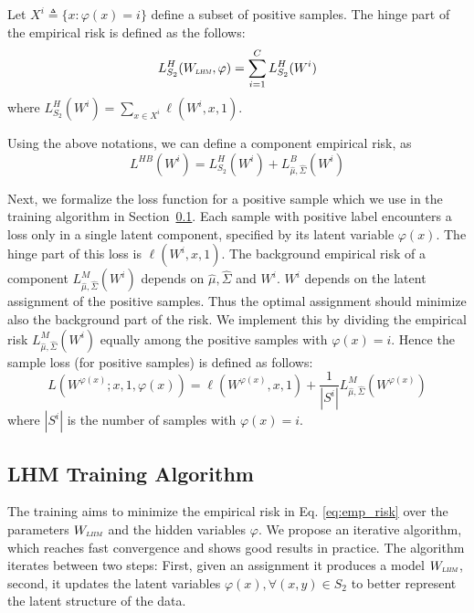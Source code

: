 \documentclass[twoside,11pt]{article}
\newcommand{\wl}{W_{\textsc{\textsc{\relsize{-2}{\textsl{LHM}}}}}}
\begin{document}
Let $X^i \triangleq \{x: \varphi(x) = i\}$ define a subset of positive samples. The hinge part of the empirical  risk is defined as the follows:
\begin{equation}
L_{S_2}^H(\wl,\varphi)=\sum_{i=1}^C L_{S_2}^H(W^i)
\end{equation}
where $L_{S_2}^H(W^i)=\sum_{x\in X^i} \ell(W^i,x,1)$.

Using the above notations, we can define a component empirical risk, as
\begin{equation}\label{eq:component_loss}
L^{HB}(W^i)= L_{S_2}^H(W^i)+L_{\hat{\mu},\hat{\Sigma}}^B(W^i)
\end{equation}

Next, we formalize the loss function for a positive sample which we use in the training algorithm in Section~\ref{sec:LHM:training}. Each sample with positive label encounters a loss only in a single latent component, specified by its latent variable $\varphi(x)$. The hinge part of this loss is $\ell(W^i,x,1)$. The background empirical risk of a component $L_{\hat{\mu},\hat{\Sigma}}^M(W^i)$ depends on $\hat{\mu},\hat{\Sigma}$ and $W^i$. $W^i$ depends on the latent assignment of the positive samples. Thus the optimal assignment should minimize also the background part of the risk. We implement this by dividing the empirical risk $L_{\hat{\mu},\hat{\Sigma}}^M(W^i)$ equally among the positive samples with  $\varphi(x)=i$. Hence the sample loss (for positive samples) is defined as follows:
\begin{equation} \label{sample:loss}
L(W^{\varphi(x)};x,1,\varphi(x))=\ell(W^{\varphi(x)},x,1)+
\frac{1}{|S^i|} L_{\hat{\mu},\hat{\Sigma}}^M(W^{\varphi(x)})
\end{equation}
where $|S^i|$ is the  number of samples with $\varphi(x)=i$.

\subsection{LHM Training Algorithm}\label{sec:LHM:training}
The training aims to minimize the empirical risk in Eq. \ref{eq:emp_risk} over the parameters $\wl$ and the hidden variables $\varphi$.  %
We propose an iterative algorithm, which reaches fast convergence and shows good results in practice. The algorithm iterates between two steps: First, given an assignment it produces a model $\wl$, second, it updates the latent variables $\varphi(x), \forall (x,y)\in S_2$ to better represent the latent structure of the data.
\end{document}
